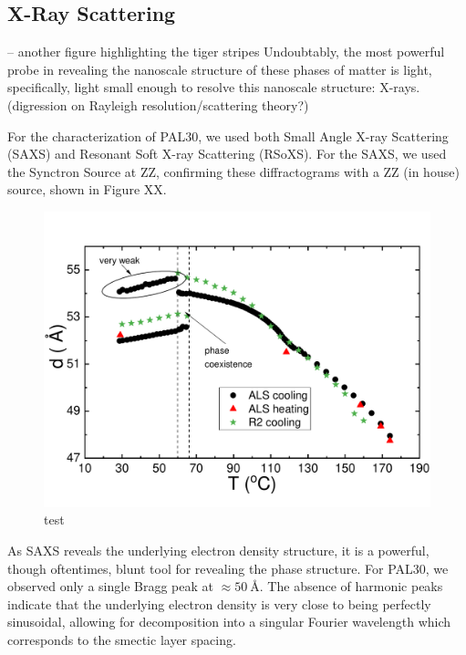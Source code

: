 \subsection{X-Ray Scattering}
-- another figure highlighting the tiger stripes
Undoubtably, the most powerful probe in revealing the nanoscale structure of
these phases of matter is light, specifically, light small enough to resolve
this nanoscale structure: X-rays. (digression on Rayleigh resolution/scattering theory?)

For the characterization of PAL30, we used both Small Angle X-ray Scattering
(SAXS) and Resonant Soft X-ray Scattering (RSoXS). For the SAXS, we used the
Synctron Source at ZZ, confirming these diffractograms with a ZZ (in house)
source, shown in Figure XX. 



\begin{figure}[h!]
    \centering
    \includegraphics[width=.8\textwidth]{./figs/pal30/finalFigs/combinedALSandR2andAlex.pdf}
    \caption{test}
\end{figure}
As SAXS reveals the underlying electron density structure, it is a powerful,
though oftentimes, blunt tool for revealing the phase structure. For PAL30, we
observed only a single Bragg peak at $\approx \SI{50}{\angstrom}$. The absence
of harmonic peaks indicate that the underlying electron density is very close to
being perfectly sinusoidal, allowing for decomposition into a singular Fourier
wavelength which corresponds to the smectic layer spacing.




